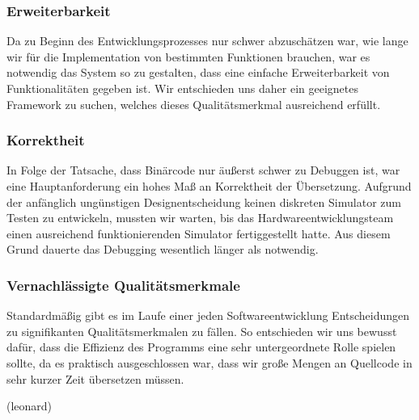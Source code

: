 \documentclass[paper=a4,fontsize=12pt,twocolumn]{scrreprt}
\begin{document}
\subsubsection{Erweiterbarkeit}
Da zu Beginn des Entwicklungsprozesses nur schwer abzuschätzen war, wie lange wir für die Implementation von bestimmten Funktionen brauchen, war es notwendig das System so zu gestalten, dass eine einfache Erweiterbarkeit von Funktionalitäten gegeben ist. Wir entschieden uns daher ein geeignetes Framework zu suchen, welches dieses Qualitätsmerkmal ausreichend erfüllt. 

\subsubsection{Korrektheit}
In Folge der Tatsache, dass Binärcode nur äußerst schwer zu Debuggen ist, war eine Hauptanforderung ein hohes Maß an Korrektheit der Übersetzung.
Aufgrund der anfänglich ungünstigen Designentscheidung keinen diskreten Simulator zum Testen zu entwickeln, mussten wir warten, bis das Hardwareentwicklungsteam einen ausreichend funktionierenden Simulator fertiggestellt hatte. Aus diesem Grund dauerte das Debugging wesentlich länger als notwendig.

\subsubsection{Vernachlässigte Qualitätsmerkmale}
Standardmäßig gibt es im Laufe einer jeden Softwareentwicklung Entscheidungen zu signifikanten Qualitätsmerkmalen zu fällen.
So entschieden wir uns bewusst dafür, dass die Effizienz des Programms eine sehr untergeordnete Rolle spielen sollte, da es praktisch ausgeschlossen war, dass wir große Mengen an Quellcode in sehr kurzer Zeit übersetzen müssen.

(leonard)
\end{document}
